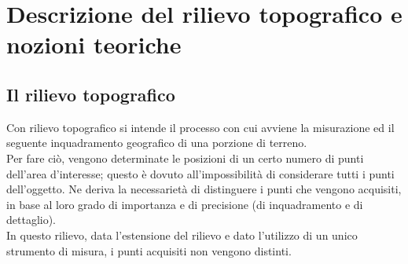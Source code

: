 \section{Descrizione del rilievo topografico e nozioni teoriche}

\subsection{Il rilievo topografico}
Con rilievo topografico si intende il processo con cui avviene la misurazione ed il seguente inquadramento geografico di una porzione di terreno.\\
Per fare ciò, vengono determinate le posizioni di un certo numero di punti dell'area d'interesse; questo è dovuto all'impossibilità di considerare tutti i punti dell'oggetto. Ne deriva la necessarietà di distinguere i punti che vengono acquisiti, in base al loro grado di importanza e di precisione (di inquadramento e di dettaglio).\\
In questo rilievo, data l'estensione del rilievo e dato l'utilizzo di un unico strumento di misura, i punti acquisiti non vengono distinti.
